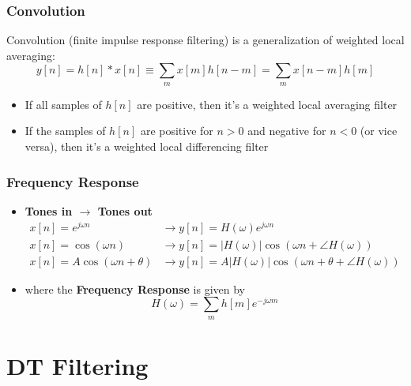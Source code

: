 \documentclass{beamer}
\begin{document}
\begin{frame}
  \frametitle{Convolution}

  Convolution (finite impulse response filtering) is a generalization of weighted local averaging:
  \begin{displaymath}
    y[n] = h[n]\ast x[n] \equiv \sum_m x[m] h[n-m] = \sum_m x[n-m] h[m]
  \end{displaymath}
  \begin{itemize}
  \item If all samples of $h[n]$ are positive, then it's a weighted
    local averaging filter
  \item If the samples of $h[n]$ are positive for $n>0$ and negative
    for $n<0$ (or vice versa), then it's a weighted local differencing
    filter
  \end{itemize}
\end{frame}

\begin{frame}
  \frametitle{Frequency Response}
  \begin{itemize}
  \item {\bf Tones in $\rightarrow$ Tones out}
    \begin{align*}
      x[n]=e^{j\omega n} &\rightarrow y[n]=H(\omega)e^{j\omega n}\\
      x[n]=\cos\left(\omega n\right)
      &\rightarrow y[n]=|H(\omega)|\cos\left(\omega n+\angle H(\omega)\right)\\
      x[n]=A\cos\left(\omega n+\theta\right)
      &\rightarrow y[n]=A|H(\omega)|\cos\left(\omega n+\theta+\angle H(\omega)\right)
    \end{align*}
  \item where the {\bf Frequency Response} is given by
    \[
    H(\omega) = \sum_m h[m]e^{-j\omega m}
    \]
  \end{itemize}
\end{frame}  

\section{DT Filtering}
\setcounter{subsection}{1}
\end{document}
